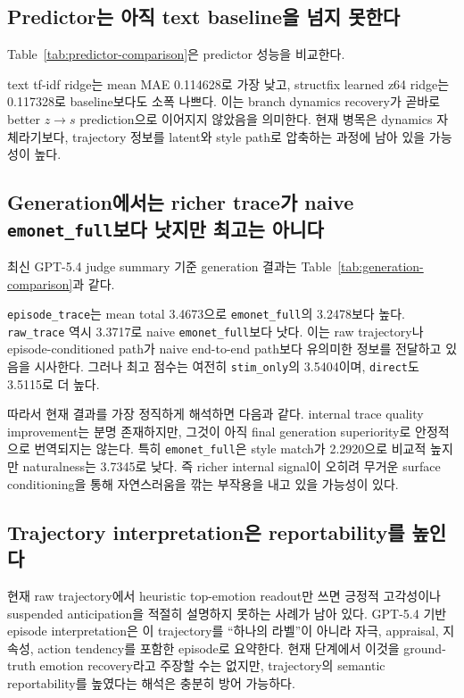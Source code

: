 \subsection{Predictor는 아직 text baseline을 넘지 못한다}

Table~\ref{tab:predictor-comparison}은 predictor 성능을 비교한다.



text tf-idf ridge는 mean MAE 0.114628로 가장 낮고, structfix learned z64 ridge는 0.117328로 baseline보다도 소폭 나쁘다. 이는 branch dynamics recovery가 곧바로 better $z \rightarrow s$ prediction으로 이어지지 않았음을 의미한다. 현재 병목은 dynamics 자체라기보다, trajectory 정보를 latent와 style path로 압축하는 과정에 남아 있을 가능성이 높다.

\subsection{Generation에서는 richer trace가 naive \texttt{emonet\_full}보다 낫지만 최고는 아니다}

최신 GPT-5.4 judge summary 기준 generation 결과는 Table~\ref{tab:generation-comparison}과 같다.



\texttt{episode\_trace}는 mean total 3.4673으로 \texttt{emonet\_full}의 3.2478보다 높다. \texttt{raw\_trace} 역시 3.3717로 naive \texttt{emonet\_full}보다 낫다. 이는 raw trajectory나 episode-conditioned path가 naive end-to-end path보다 유의미한 정보를 전달하고 있음을 시사한다. 그러나 최고 점수는 여전히 \texttt{stim\_only}의 3.5404이며, \texttt{direct}도 3.5115로 더 높다.

따라서 현재 결과를 가장 정직하게 해석하면 다음과 같다. internal trace quality improvement는 분명 존재하지만, 그것이 아직 final generation superiority로 안정적으로 번역되지는 않는다. 특히 \texttt{emonet\_full}은 style match가 2.2920으로 비교적 높지만 naturalness는 3.7345로 낮다. 즉 richer internal signal이 오히려 무거운 surface conditioning을 통해 자연스러움을 깎는 부작용을 내고 있을 가능성이 있다.

\subsection{Trajectory interpretation은 reportability를 높인다}

현재 raw trajectory에서 heuristic top-emotion readout만 쓰면 긍정적 고각성이나 suspended anticipation을 적절히 설명하지 못하는 사례가 남아 있다. GPT-5.4 기반 episode interpretation은 이 trajectory를 ``하나의 라벨''이 아니라 자극, appraisal, 지속성, action tendency를 포함한 episode로 요약한다. 현재 단계에서 이것을 ground-truth emotion recovery라고 주장할 수는 없지만, trajectory의 semantic reportability를 높였다는 해석은 충분히 방어 가능하다.
